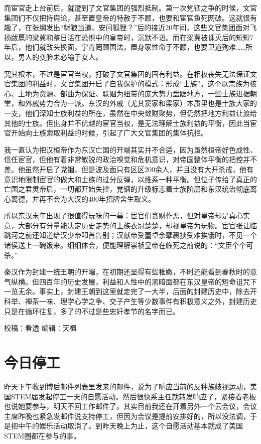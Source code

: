 \documentclass[
]{book}
\begin{document}
而宦官走上台前后，就遭到了文官集团的强烈抵制。第一次党锢之争的时候，文官集团们不仅把持舆论，甚至置皇帝的特赦于不顾，也要和宦官鱼死网破。这就很有趣了，在张纲发出``豺狼当道、安问狐狸？''后的接近20年间，这些文官集团面对飞扬跋扈的梁冀和整日活在恐惧中的皇帝时，沉默不语。而在梁冀被诛灭后的短短7年后，他们就改头换面，宁肯罔顾国法，置身家性命于不顾，也要卫道殉难\ldots\ldots 所以，男人的变脸未必输于女人。

究其根本，不过是宦官当权，打破了文官集团的固有利益。在相权丧失无法保证文官集团的利益时，文官集团开启了自我保护的模式：形成``士族''。这个以宗族为核心、土地为资源、部曲为保证、联姻为纽带的庞大势力盘踞地方，一些士族进据朝堂，和外戚势力合为一派。东汉的外戚（尤其窦家和梁家）本质里也是士族大家的一支，他们深知士族利益的所在，虽然在中央敛财聚势，但仍然把地方利益让渡给其他的士族。但出身并不优越的宦官当权，是无法理解士族利益的平衡，因此当宦官开始向士族索取利益的时候，引起了广大文官集团的集体抗拒。

我一直认为把汉桓帝作为东汉亡国的开端其实并不合适，因为虽然桓帝好色成性、信任宦官，但他有着非常敏锐的政治嗅觉和危机意识，对帝国整体平衡的把控并不差。他虽然开启了党锢，但是波及面只有区区200余人，并且没有大开杀戒，他有意识地限制宦官的做大和士族的过分反弹，以维系一种平衡。但位子传给了真正的亡国之君灵帝后，一切都开始失控，党锢的升级标志着士族阶层和东汉统治彻底离心离德，并再不会为大汉的400年招牌舍生取义。

所以东汉末年出现了很值得玩味的一幕：宦官们贪财作恶，但对皇帝却是真心实意，大部分有分量能决定历史走势的士族衣冠楚楚，却视皇帝为玩物。宦官张让临跳河之前还知道给汉少帝叩首告别；汉献帝受董卓余孽裹挟受难挨饿时，不见一个诸侯送上一碗饭来。细细体会，便能理解崇祯皇帝在临死之前说的：``文臣个个可杀。''

秦汉作为封建一统王朝的开端，在初期还显得有些稚嫩，不时还能看到春秋时的意气纵横。但四百年的历史发展，利益和人性中的黑暗面都在东汉皇帝的短命诅咒下一览无余。事实上，封建王朝到这里就走完了一大半，后面的封建历史中，除去开科举、禅茶一味、理学心学之争、交子产生等少数事件有积极意义之外，封建历史只是在循环往复，多了的不过是些忠奸孝节的名字而已。

校稿：看透
编辑：天枫

\hypertarget{ux4ecaux65e5ux505cux5de5}{%
\section{今日停工}\label{ux4ecaux65e5ux505cux5de5}}

昨天下午收到博后邮件列表里发来的邮件，说为了响应当前的反种族歧视运动，美国STEM届发起停工一天的自愿活动。然后很快系主任就转发响应了，紧接着老板也说她要参与，明天不回工作邮件了。其实目前我还在开着另外一个云会议，会议主席昨晚也紧急发邮件说支持停工，但因为会议是提前安排好的，所以没法调，于是把中午的娱乐活动取消了。到昨天晚上为止，这个自愿活动基本就成了美国STEM圈都在参与的事。
\end{document}
